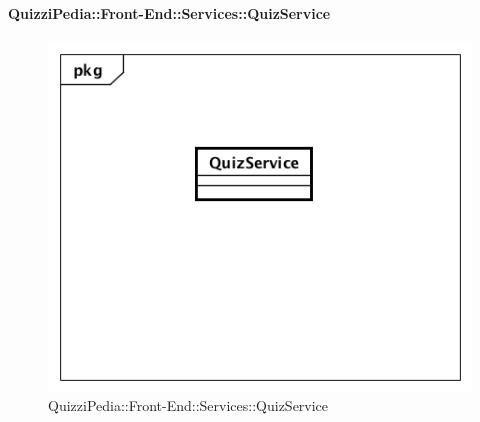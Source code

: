 \paragraph{QuizziPedia::Front-End::Services::QuizService}
\begin{figure}
	\centering
	\includegraphics[scale=0.45]{UML/Classi/Front-End/QuizziPedia_Front-end_Services_ QuizService.png}
	\caption{QuizziPedia::Front-End::Services::QuizService}
\end{figure}
